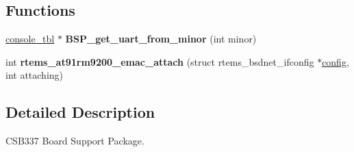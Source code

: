 \subsection*{Functions}
\begin{DoxyCompactItemize}
\item 
\mbox{\label{group__RTEMSBSPsARMCSB337_gaa0c77382e4022ffc14d71265951cbf99}} 
\mbox{\hyperlink{struct__console__tbl}{console\+\_\+tbl}} $\ast$ {\bfseries B\+S\+P\+\_\+get\+\_\+uart\+\_\+from\+\_\+minor} (int minor)
\item 
\mbox{\label{group__RTEMSBSPsARMCSB337_ga0af96284384cc871cb43c05cf760a59d}} 
int {\bfseries rtems\+\_\+at91rm9200\+\_\+emac\+\_\+attach} (struct rtems\+\_\+bsdnet\+\_\+ifconfig $\ast$\mbox{\hyperlink{structconfig__s}{config}}, int attaching)
\end{DoxyCompactItemize}


\subsection{Detailed Description}
C\+S\+B337 Board Support Package. 

